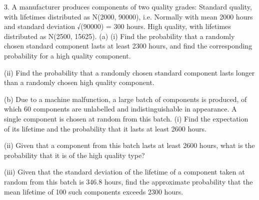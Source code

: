 \documentclass[a4paper,12pt]{article}
\begin{document}
\begin{framed}
3. A manufacturer produces components of two quality grades:
Standard quality, with lifetimes distributed as N(2000, 90000), i.e.
Normally with mean 2000 hours and standard deviation √(90000) = 300
hours.
High quality, with lifetimes distributed as N(2500, 15625).
(a) (i) Find the probability that a randomly chosen standard component
lasts at least 2300 hours, and find the corresponding probability for
a high quality component.

(ii) Find the probability that a randomly chosen standard component
lasts longer than a randomly chosen high quality component.

(b) Due to a machine malfunction, a large batch of components is produced, of
which 60%
components are unlabelled and indistinguishable in appearance. A single
component is chosen at random from this batch.
(i) Find the expectation of its lifetime and the probability that it lasts
at least 2600 hours.

(ii) Given that a component from this batch lasts at least 2600 hours,
what is the probability that it is of the high quality type?

(iii) Given that the standard deviation of the lifetime of a component
taken at random from this batch is 346.8 hours, find the
approximate probability that the mean lifetime of 100 such
components exceeds 2300 hours.
\end{framed}
\end{document}
